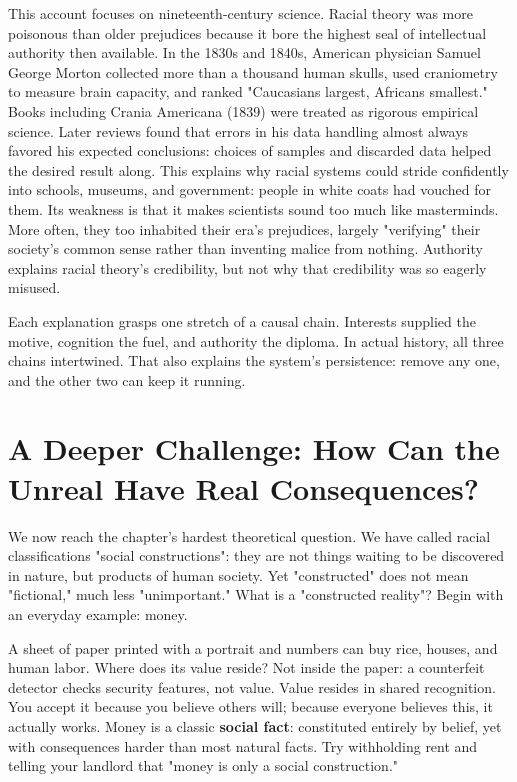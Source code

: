 This account focuses on nineteenth-century science. Racial theory was more poisonous than older prejudices because it bore the highest seal of intellectual authority then available. In the 1830s and 1840s, American physician Samuel George Morton collected more than a thousand human skulls, used craniometry to measure brain capacity, and ranked "Caucasians largest, Africans smallest." Books including Crania Americana (1839) were treated as rigorous empirical science. Later reviews found that errors in his data handling almost always favored his expected conclusions: choices of samples and discarded data helped the desired result along. This explains why racial systems could stride confidently into schools, museums, and government: people in white coats had vouched for them. Its weakness is that it makes scientists sound too much like masterminds. More often, they too inhabited their era's prejudices, largely "verifying" their society's common sense rather than inventing malice from nothing. Authority explains racial theory's credibility, but not why that credibility was so eagerly misused.

Each explanation grasps one stretch of a causal chain. Interests supplied the motive, cognition the fuel, and authority the diploma. In actual history, all three chains intertwined. That also explains the system's persistence: remove any one, and the other two can keep it running.

\section[The Unreal Has Real Consequences]{A Deeper Challenge: How Can the Unreal Have Real Consequences?}
We now reach the chapter's hardest theoretical question. We have called racial classifications "social constructions": they are not things waiting to be discovered in nature, but products of human society. Yet "constructed" does not mean "fictional," much less "unimportant." What is a "constructed reality"? Begin with an everyday example: money.

A sheet of paper printed with a portrait and numbers can buy rice, houses, and human labor. Where does its value reside? Not inside the paper: a counterfeit detector checks security features, not value. Value resides in shared recognition. You accept it because you believe others will; because everyone believes this, it actually works. Money is a classic \textbf{social fact}: constituted entirely by belief, yet with consequences harder than most natural facts. Try withholding rent and telling your landlord that "money is only a social construction."

